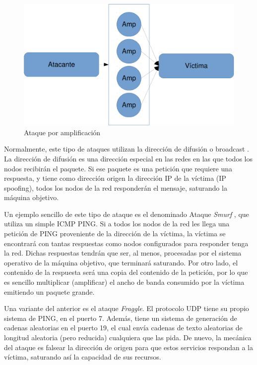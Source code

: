 \begin{figure}[htbp]
\centering
\includegraphics[width=.8\textwidth]{CapituloDDoS/Figuras/Amplificacion}
\caption{Ataque por amplificación}
\end{figure}
%

Normalmente, este tipo de ataques utilizan la dirección de difusión o broadcast  . La 
dirección de difusión es una dirección especial en las redes en las que todos los nodos recibirán el paquete. Si ese 
paquete es una petición que requiere una respuesta, y tiene como dirección origen la dirección IP 
de la víctima (IP spoofing), todos los nodos de la red responderán el mensaje, saturando la máquina 
objetivo.

Un ejemplo sencillo de este tipo de ataque es el denominado Ataque \emph{Smurf} , que utiliza un 
simple \gls{ICMP} PING. Si a todos los nodos de la red les llega una petición de PING 
proveniente de la dirección de la víctima, la víctima se encontrará con tantas respuestas como nodos configurados para 
responder tenga la red. Dichas respuestas tendrán que ser, al menos, procesadas por el sistema operativo de la máquina 
objetivo, que terminará saturando. Por otro lado, el contenido de la respuesta será una copia del contenido de la 
petición, por lo que es sencillo multiplicar (amplificar) el ancho de banda consumido por la víctima emitiendo un 
paquete grande.

Una variante del anterior es el ataque \emph{Fraggle}. El protocolo \gls{UDP} tiene su propio sistema de PING, en 
el puerto 7. Además, tiene un sistema de generación de cadenas aleatorias en el puerto 19, el cual envía cadenas de 
texto aleatorias de longitud aleatoria (pero reducida) cualquiera que las pida. De nuevo, la mecánica del ataque es 
falsear la dirección de origen para que estos servicios respondan a la víctima, saturando así la capacidad de sus 
recursos.

